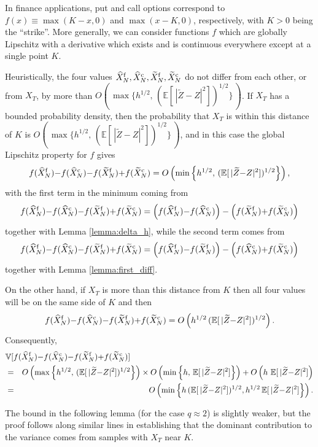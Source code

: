 \documentclass[11pt]{article}
\def \EE {{\mathbb{E}}}
\def \VV {{\mathbb{V}}}
\def \tZ {{\widetilde{Z}}}
\def \tXf  {{\widetilde{X}^{\rm f}}}
\def \tXc  {{\widetilde{X}^{\rm c}}}
\def \hXf {{\widehat{X}^{\rm f}}}
\def \hXc {{\widehat{X}^{\rm c}}}
\begin{document}
In finance applications, put and call options correspond to
$f(x)\equiv \max(K{-}x,0)$ and $\max(x{-}K,0)$, respectively,
with $K{>}0$ being the ``strike''. 
More generally, we can consider functions $f$ which are 
globally Lipschitz with a derivative which exists and is 
continuous everywhere except at a single point $K$.

Heuristically, the four values $\hXf_N, \hXc_N, \tXf_N, \tXc_N$ 
do not differ from each other, or from $X_T$, by more than 
$O(\, \max\{ h^{1/2}, \, (\EE[\, |\tZ{-}Z|^2])^{1/2}\}\, )$.
If $X_T$ has a bounded probability density, then the 
probability that $X_T$ is within this distance of $K$
is $O(\, \max\{ h^{1/2}, \, (\EE[\, |\tZ{-}Z|^2])^{1/2}\}\, )$, 
and in this case the global Lipschitz property for $f$ gives
\[
f(\hXf_N) {-} f(\hXc_N) {-} f(\tXf_N) {+} f(\tXc_N)
= O\left( \min\left\{ h^{1/2}, \, (\EE[\, |\tZ{-}Z|^2])^{1/2} \right\} \right),
\]
with the first term in the minimum coming from 
\[
f(\hXf_N) {-} f(\hXc_N) {-} f(\tXf_N) {+} f(\tXc_N)
= \left( f(\hXf_N) {-} f(\hXc_N) \right) - \left(f(\tXf_N) {+} f(\tXc_N)\right)
\]
together with Lemma \ref{lemma:delta_h}, while the second term comes from
\[
f(\hXf_N) {-} f(\hXc_N) {-} f(\tXf_N) {+} f(\tXc_N)
= \left( f(\hXf_N) {-} f(\tXf_N) \right) - \left(f(\hXc_N) {+} f(\tXc_N)\right)
\]
together with Lemma \ref{lemma:first_diff}.

On the other hand, if $X_T$ is more than this distance from $K$ 
then all four values will be on the same side of $K$ and then
\[
f(\hXf_N) {-} f(\hXc_N) {-} f(\tXf_N) {+} f(\tXc_N)
= O\left( h^{1/2}\, (\EE[\, |\tZ{-}Z|^2])^{1/2} \right).
\]
Consequently,
\begin{eqnarray*}
\lefteqn{
\VV[f(\hXf_N) {-} f(\hXc_N) {-} f(\tXf_N) {+} f(\tXc_N)] 
}
\\ &=& O\left(\max\left\{ h^{1/2},\, (\EE[\, |\tZ{-}Z|^2])^{1/2}\right\} \right)
 \times O\left( \min\left\{ h,\, \EE[\, |\tZ{-}Z|^2] \right\} \right)
 + O\left( h \ \EE[\, |\tZ{-}Z|^2] \right)
\\ &=& O\left( \min\left\{ h\, (\EE[\, |\tZ{-}Z|^2])^{1/2},
                       h^{1/2}\, \EE[\, |\tZ{-}Z|^2] \right\} \right).
\end{eqnarray*}

The bound in the following lemma (for the case $q{\approx}2$) is
slightly weaker, but the proof follows along similar lines in
establishing that the dominant contribution to the variance comes
from samples with $X_T$ near $K$.
\end{document}
